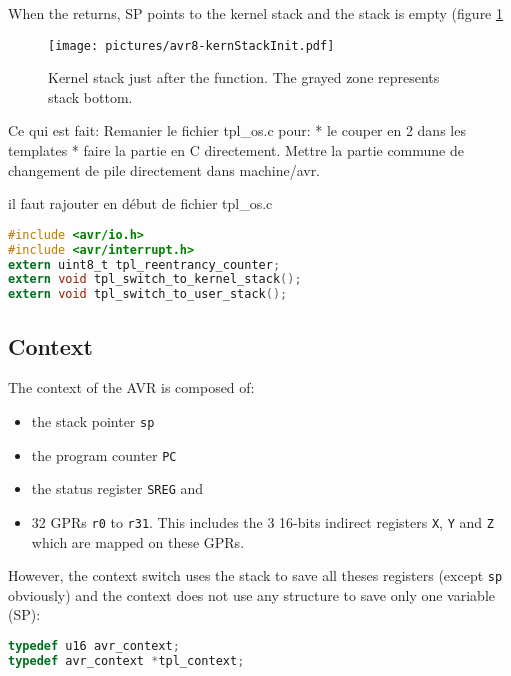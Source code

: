 When the  returns, SP points to the kernel stack and the stack is empty (figure \ref{fig:avr8kernStackInit}
\begin{figure}[htbp] %
\begin{minipage}{0.5\textwidth}
    \centering
  \texttt{[image: pictures/avr8-kernStackInit.pdf]} 
\end{minipage}
\begin{minipage}{0.5\textwidth}
   \caption{Kernel stack just after the  function. The grayed zone represents stack bottom.}
   \label{fig:avr8kernStackInit}
\end{minipage}
\end{figure}



Ce qui est fait:
Remanier le fichier tpl_os.c pour:
* le couper en 2 dans les templates
* faire la partie en C directement. Mettre la partie commune de changement de pile directement dans
machine/avr.

il faut rajouter en début de fichier tpl_os.c
\begin{lstlisting}[language=C]
#include <avr/io.h>
#include <avr/interrupt.h>
extern uint8_t tpl_reentrancy_counter;
extern void tpl_switch_to_kernel_stack();
extern void tpl_switch_to_user_stack();
\end{lstlisting}




\subsection{Context}
The context of the AVR is composed of:
\begin{itemize}
\item the stack pointer \texttt{sp}
\item the program counter \texttt{PC}
\item the status register \texttt{SREG} and 
\item 32 GPRs \texttt{r0} to \texttt{r31}. This includes the 3 16-bits indirect registers \texttt{X}, \texttt{Y} and \texttt{Z} which are mapped on these GPRs.
\end{itemize}

However, the context switch uses the stack to save all theses registers (except \texttt{sp} obviously) and the context does not use any structure to save only one variable (SP):
\begin{lstlisting}[language=C]
typedef u16 avr_context;
typedef avr_context *tpl_context;
\end{lstlisting}

